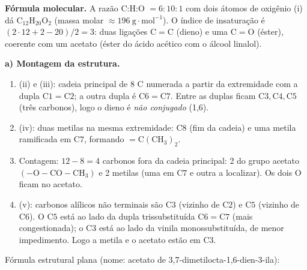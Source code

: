 \documentclass{article}%
\begin{document}
\textbf{Fórmula molecular.} A razão C:H:O $=6:10:1$ com dois átomos de oxigênio (i) dá $\mathrm{C_{12}H_{20}O_2}$ (massa molar $\approx 196\ \mathrm{g\cdot mol^{-1}}$). O índice de insaturação é $(2\cdot 12+2-20)/2=3$: duas ligações $\mathrm{C{=}C}$ (dieno) e uma $\mathrm{C{=}O}$ (éster), coerente com um acetato (éster do ácido acético com o álcool linalol).

\textbf{a) Montagem da estrutura.}
\begin{enumerate}
\item (ii) e (iii): cadeia principal de 8 C numerada a partir da extremidade com a dupla $\mathrm{C1{=}C2}$; a outra dupla é $\mathrm{C6{=}C7}$. Entre as duplas ficam $\mathrm{C3,C4,C5}$ (três carbonos), logo o dieno é \emph{não conjugado} (1,6).
\item (iv): duas metilas na mesma extremidade: $\mathrm{C8}$ (fim da cadeia) e uma metila ramificada em $\mathrm{C7}$, formando $\mathrm{=C(CH_3)_2}$.
\item Contagem: $12-8=4$ carbonos fora da cadeia principal: 2 do grupo acetato $\mathrm{(-O-CO-CH_3)}$ e 2 metilas (uma em $\mathrm{C7}$ e outra a localizar). Os dois O ficam no acetato.
\item (v): carbonos alílicos não terminais são $\mathrm{C3}$ (vizinho de $\mathrm{C2}$) e $\mathrm{C5}$ (vizinho de $\mathrm{C6}$). O $\mathrm{C5}$ está ao lado da dupla trissubstituída $\mathrm{C6{=}C7}$ (mais congestionada); o $\mathrm{C3}$ está ao lado da vinila monossubstituída, de menor impedimento. Logo a metila e o acetato estão em $\mathrm{C3}$.
\end{enumerate}

Fórmula estrutural plana (nome: acetato de 3,7-dimetilocta-1,6-dien-3-ila):
\end{document}
